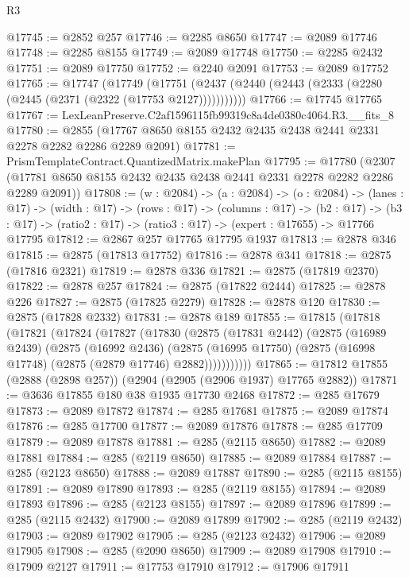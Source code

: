 \begin{lexlean}{R3}
\begin{coremodule}
@17745 := @2852 @257
@17746 := @2285 @8650
@17747 := @2089 @17746
@17748 := @2285 @8155
@17749 := @2089 @17748
@17750 := @2285 @2432
@17751 := @2089 @17750
@17752 := @2240 @2091
@17753 := @2089 @17752
@17765 := @17747
    (@17749 (@17751 (@2437 (@2440 (@2443 (@2333 (@2280 (@2445 (@2371 (@2322 (@17753 @2127)))))))))))
@17766 := @17745 @17765
@17767 := LexLeanPreserve.C2af1596115fb99319c8a4de0380c4064.R3.__fits_8
@17780 := @2855 (@17767 @8650 @8155 @2432 @2435 @2438 @2441 @2331 @2278 @2282 @2286 @2289 @2091)
@17781 := PrismTemplateContract.QuantizedMatrix.makePlan
@17795 := @17780
    (@2307 (@17781 @8650 @8155 @2432 @2435 @2438 @2441 @2331 @2278 @2282 @2286 @2289 @2091))
@17808 := (w : @2084) ->
  (a : @2084) ->
  (o : @2084) ->
  (lanes : @17) ->
  (width : @17) ->
  (rows : @17) ->
  (columns : @17) ->
  (b2 : @17) -> (b3 : @17) -> (ratio2 : @17) -> (ratio3 : @17) -> (expert : @17655) -> @17766 @17795
@17812 := @2867 @257 @17765 @17795 @1937
@17813 := @2878 @346
@17815 := @2875 (@17813 @17752)
@17816 := @2878 @341
@17818 := @2875 (@17816 @2321)
@17819 := @2878 @336
@17821 := @2875 (@17819 @2370)
@17822 := @2878 @257
@17824 := @2875 (@17822 @2444)
@17825 := @2878 @226
@17827 := @2875 (@17825 @2279)
@17828 := @2878 @120
@17830 := @2875 (@17828 @2332)
@17831 := @2878 @189
@17855 := @17815
    (@17818
      (@17821
        (@17824
          (@17827
            (@17830
              (@2875
                (@17831 @2442)
                (@2875
                  (@16989 @2439)
                  (@2875
                    (@16992 @2436)
                    (@2875
                      (@16995 @17750)
                      (@2875 (@16998 @17748) (@2875 (@2879 @17746) @2882)))))))))))
@17865 := @17812 @17855 (@2888 (@2898 @257)) (@2904 (@2905 (@2906 @1937) @17765 @2882))
@17871 := @3636 @17855 @180 @38 @1935 @17730 @2468
@17872 := @285 @17679
@17873 := @2089 @17872
@17874 := @285 @17681
@17875 := @2089 @17874
@17876 := @285 @17700
@17877 := @2089 @17876
@17878 := @285 @17709
@17879 := @2089 @17878
@17881 := @285 (@2115 @8650)
@17882 := @2089 @17881
@17884 := @285 (@2119 @8650)
@17885 := @2089 @17884
@17887 := @285 (@2123 @8650)
@17888 := @2089 @17887
@17890 := @285 (@2115 @8155)
@17891 := @2089 @17890
@17893 := @285 (@2119 @8155)
@17894 := @2089 @17893
@17896 := @285 (@2123 @8155)
@17897 := @2089 @17896
@17899 := @285 (@2115 @2432)
@17900 := @2089 @17899
@17902 := @285 (@2119 @2432)
@17903 := @2089 @17902
@17905 := @285 (@2123 @2432)
@17906 := @2089 @17905
@17908 := @285 (@2090 @8650)
@17909 := @2089 @17908
@17910 := @17909 @2127
@17911 := @17753 @17910
@17912 := @17906 @17911

\end{coremodule}
\end{lexlean}
